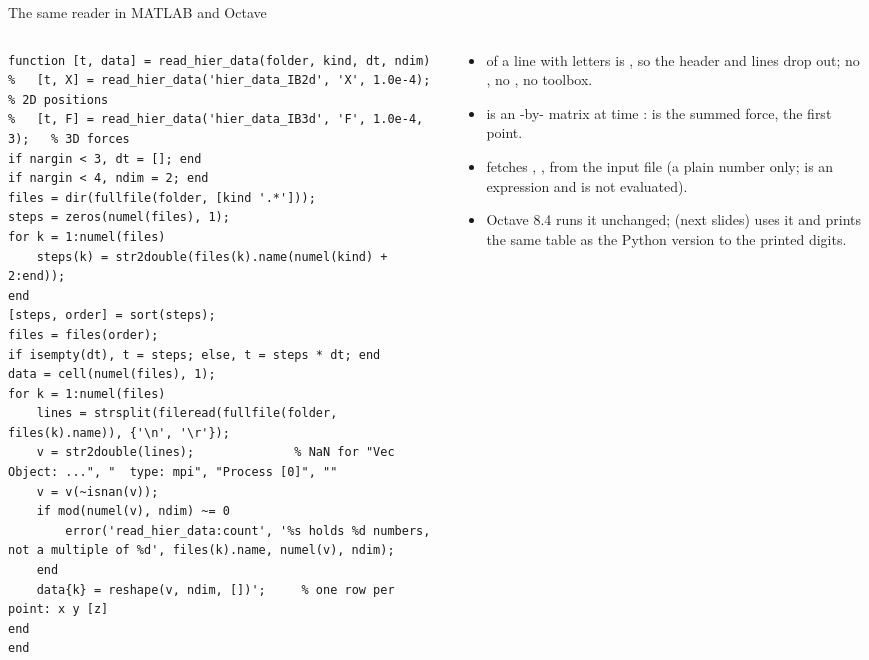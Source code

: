 \documentclass[aspectratio=169,11pt]{beamer}
\begin{document}
\begin{frame}[fragile]{The same reader in MATLAB and Octave}
\label{fr:mreader}
\vspace{-3mm}
\begin{columns}[T,onlytextwidth]
\begin{column}{0.56\textwidth}
\begin{lstlisting}[style=matlabtiny]
% examples/analysis/read_hier_data.m
function [t, data] = read_hier_data(folder, kind, dt, ndim)
%   [t, X] = read_hier_data('hier_data_IB2d', 'X', 1.0e-4);      % 2D positions
%   [t, F] = read_hier_data('hier_data_IB3d', 'F', 1.0e-4, 3);   % 3D forces
if nargin < 3, dt = []; end
if nargin < 4, ndim = 2; end
files = dir(fullfile(folder, [kind '.*']));
steps = zeros(numel(files), 1);
for k = 1:numel(files)
    steps(k) = str2double(files(k).name(numel(kind) + 2:end));
end
[steps, order] = sort(steps);
files = files(order);
if isempty(dt), t = steps; else, t = steps * dt; end
data = cell(numel(files), 1);
for k = 1:numel(files)
    lines = strsplit(fileread(fullfile(folder, files(k).name)), {'\n', '\r'});
    v = str2double(lines);              % NaN for "Vec Object: ...", "  type: mpi", "Process [0]", ""
    v = v(~isnan(v));
    if mod(numel(v), ndim) ~= 0
        error('read_hier_data:count', '%s holds %d numbers, not a multiple of %d', files(k).name, numel(v), ndim);
    end
    data{k} = reshape(v, ndim, [])';     % one row per point: x y [z]
end
end
\end{lstlisting}
\end{column}
\begin{column}{0.42\textwidth}
\scriptsize
\begin{itemize}
  \item {} of a line with letters is , so the header and  lines drop out; no , no , no toolbox.
  \item {} is an -by- matrix at time :  is the summed force,  the first point.
  \item {} fetches , ,  from the input file (a plain number only;  is an expression and is not evaluated).
  \item Octave 8.4 runs it unchanged;  (next slides) uses it and prints the same table as the Python version to the printed digits.
\end{itemize}
\end{column}
\end{columns}
\end{frame}
\end{document}
